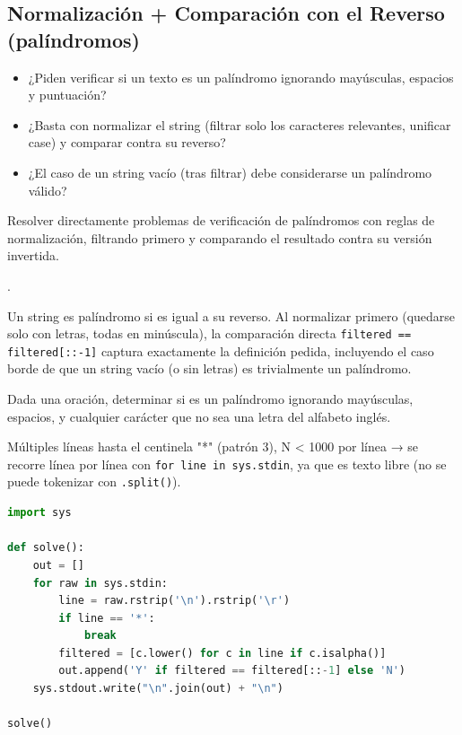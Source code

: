 \subsection{Normalización + Comparación con el Reverso (palíndromos)}


\begin{itemize}
\item ¿Piden verificar si un texto es un palíndromo ignorando mayúsculas, espacios y puntuación?
\item ¿Basta con normalizar el string (filtrar solo los caracteres relevantes, unificar case) y comparar contra su reverso?
\item ¿El caso de un string vacío (tras filtrar) debe considerarse un palíndromo válido?
\end{itemize}

 Resolver directamente problemas de verificación de palíndromos con reglas de normalización, filtrando primero y comparando el resultado contra su versión invertida.

 .

 Un string es palíndromo si es igual a su reverso. Al normalizar primero (quedarse solo con letras, todas en minúscula), la comparación directa \texttt{filtered == filtered[::-1]} captura exactamente la definición pedida, incluyendo el caso borde de que un string vacío (o sin letras) es trivialmente un palíndromo.


Dada una oración, determinar si es un palíndromo ignorando mayúsculas, espacios, y cualquier carácter que no sea una letra del alfabeto inglés.

 Múltiples líneas hasta el centinela "*" (patrón 3), N < 1000 por línea → se recorre línea por línea con \texttt{for line in sys.stdin}, ya que es texto libre (no se puede tokenizar con \texttt{.split()}).


\begin{lstlisting}[language=Python]
import sys

def solve():
    out = []
    for raw in sys.stdin:
        line = raw.rstrip('\n').rstrip('\r')
        if line == '*':
            break
        filtered = [c.lower() for c in line if c.isalpha()]
        out.append('Y' if filtered == filtered[::-1] else 'N')
    sys.stdout.write("\n".join(out) + "\n")

solve()
\end{lstlisting}
